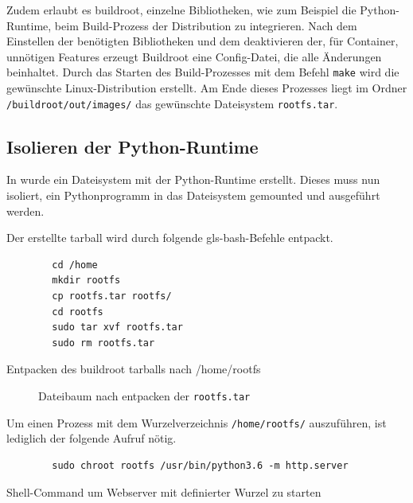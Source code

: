Zudem erlaubt es buildroot, einzelne Bibliotheken, wie zum Beispiel die Python-Runtime, beim Build-Prozess der Distribution zu integrieren. Nach dem Einstellen der benötigten Bibliotheken und dem deaktivieren der, für Container, unnötigen Features erzeugt Buildroot eine Config-Datei, die alle Änderungen beinhaltet. Durch das Starten des Build-Prozesses mit dem Befehl \texttt{make} wird die gewünschte Linux-Distribution erstellt. Am Ende dieses Prozesses liegt im Ordner \texttt{/buildroot/out/images/} das gewünschte Dateisystem \texttt{rootfs.tar}.

\subsection{Isolieren der Python-Runtime}
\label{sec:isolieren}
In  wurde ein Dateisystem mit der Python-Runtime erstellt. Dieses muss nun isoliert, ein Pythonprogramm in das Dateisystem gemounted und ausgeführt werden.

Der erstellte tarball wird durch folgende \gls{gls-bash}-Befehle entpackt. 

\begin{listing}[h]
	\begin{verbatim}
		cd /home
		mkdir rootfs
		cp rootfs.tar rootfs/
		cd rootfs
		sudo tar xvf rootfs.tar
		sudo rm rootfs.tar
	\end{verbatim}
	\caption{Entpacken des buildroot tarballs nach /home/rootfs}
	\label{lst:untarRootfs}
\end{listing}


\begin{figure}[h]
	\centering
	\begin{minipage}{0.9\textwidth}
	\end{minipage}
	\caption{Dateibaum nach entpacken der \texttt{rootfs.tar}}
	\label{fig:baumNachUntar}
\end{figure}

Um einen Prozess mit dem Wurzelverzeichnis \texttt{/home/rootfs/} auszuführen, ist lediglich der folgende Aufruf nötig.
\begin{listing}[h]
	\begin{verbatim}
		sudo chroot rootfs /usr/bin/python3.6 -m http.server
	\end{verbatim}
	\caption{Shell-Command um Webserver mit definierter Wurzel zu starten}
	\label{lst:pythonChrooted}
\end{listing}

